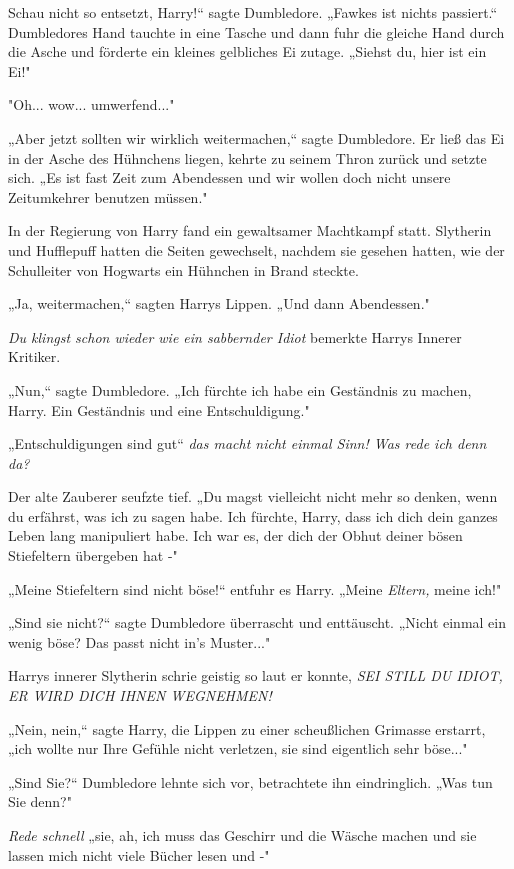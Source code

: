 {Schau nicht so entsetzt, Harry!“ sagte Dumbledore. „Fawkes ist nichts passiert.“ Dumbledores Hand tauchte in eine Tasche und dann fuhr die gleiche Hand durch die Asche und förderte ein kleines gelbliches Ei zutage. „Siehst du, hier ist ein Ei!"

"Oh... wow... umwerfend..."

„Aber jetzt sollten wir wirklich weitermachen,“ sagte Dumbledore. Er ließ das Ei in der Asche des Hühnchens liegen, kehrte zu seinem Thron zurück und setzte sich. „Es ist fast Zeit zum Abendessen und wir wollen doch nicht unsere Zeitumkehrer benutzen müssen."

In der Regierung von Harry fand ein gewaltsamer Machtkampf statt. Slytherin und Hufflepuff hatten die Seiten gewechselt, nachdem sie gesehen hatten, wie der Schulleiter von Hogwarts ein Hühnchen in Brand steckte.

„Ja, weitermachen,“ sagten Harrys Lippen. „Und dann Abendessen."

\emph{Du klingst schon wieder wie ein sabbernder Idiot} bemerkte Harrys Innerer Kritiker.

„Nun,“ sagte Dumbledore. „Ich fürchte ich habe ein Geständnis zu machen, Harry. Ein Geständnis und eine Entschuldigung."

„Entschuldigungen sind gut“ \emph{das macht nicht einmal Sinn! Was rede ich denn da?}

Der alte Zauberer seufzte tief. „Du magst vielleicht nicht mehr so denken, wenn du erfährst, was ich zu sagen habe. Ich fürchte, Harry, dass ich dich dein ganzes Leben lang manipuliert habe. Ich war es, der dich der Obhut deiner bösen Stiefeltern übergeben hat -"

„Meine Stiefeltern sind nicht böse!“ entfuhr es Harry. „Meine \emph{Eltern,} meine ich!"

„Sind sie nicht?“ sagte Dumbledore überrascht und enttäuscht. „Nicht einmal ein wenig böse? Das passt nicht in's Muster..."

Harrys innerer Slytherin schrie geistig so laut er konnte, \emph{SEI STILL DU IDIOT, ER WIRD DICH IHNEN WEGNEHMEN!}

„Nein, nein,“ sagte Harry, die Lippen zu einer scheußlichen Grimasse erstarrt, „ich wollte nur Ihre Gefühle nicht verletzen, sie sind eigentlich sehr böse..."

„Sind Sie?“ Dumbledore lehnte sich vor, betrachtete ihn eindringlich. „Was tun Sie denn?"

\emph{Rede schnell} „sie, ah, ich muss das Geschirr und die Wäsche machen und sie lassen mich nicht viele Bücher lesen und -"

}
